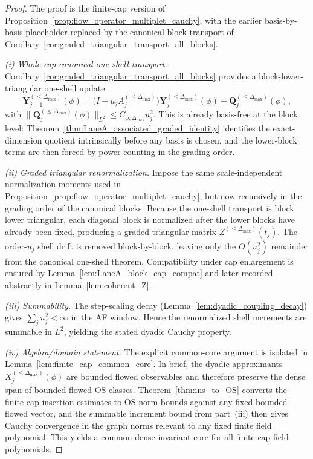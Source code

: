 \begin{proof}
The proof is the finite-cap version of Proposition~\ref{prop:flow_operator_multiplet_cauchy}, with the earlier basis-by-basis placeholder replaced by the canonical block transport of Corollary~\ref{cor:graded_triangular_transport_all_blocks}.

\smallskip
\noindent\emph{(i) Whole-cap canonical one-shell transport.}
Corollary~\ref{cor:graded_triangular_transport_all_blocks} provides a block-lower-triangular one-shell update
\[
\mathbf Y^{(\le \Delta_{\max})}_{j+1}(\phi)
=
\bigl(I+u_jA^{(\le \Delta_{\max})}_j\bigr)\mathbf Y^{(\le \Delta_{\max})}_j(\phi)
+\mathbf Q^{(\le \Delta_{\max})}_j(\phi),
\]
with $\|\mathbf Q^{(\le \Delta_{\max})}_j(\phi)\|_{L^2}\le C_{\phi,\Delta_{\max}}u_j^2$.
This is already basis-free at the block level: Theorem~\ref{thm:LaneA_associated_graded_identity} identifies the exact-dimension quotient intrinsically before any basis is chosen, and the lower-block terms are then forced by power counting in the grading order.

\smallskip
\noindent\emph{(ii) Graded triangular renormalization.}
Impose the same scale-independent normalization moments used in Proposition~\ref{prop:flow_operator_multiplet_cauchy}, but now recursively in the grading order of the canonical blocks.
Because the one-shell transport is block lower triangular, each diagonal block is normalized after the lower blocks have already been fixed, producing a graded triangular matrix $Z^{(\le\Delta_{\max})}(t_j)$.
The order-$u_j$ shell drift is removed block-by-block, leaving only the $O(u_j^2)$ remainder from the canonical one-shell theorem.
Compatibility under cap enlargement is ensured by Lemma~\ref{lem:LaneA_block_cap_compat} and later recorded abstractly in Lemma~\ref{lem:coherent_Z}.

\smallskip
\noindent\emph{(iii) Summability.}
The step-scaling decay (Lemma~\ref{lem:dyadic_coupling_decay}) gives $\sum_j u_j^2<\infty$ in the AF window.
Hence the renormalized shell increments are summable in $L^2$, yielding the stated dyadic Cauchy property.

\smallskip
\noindent\emph{(iv) Algebra/domain statement.}
The explicit common-core argument is isolated in Lemma~\ref{lem:finite_cap_common_core}.
In brief, the dyadic approximants $X^{(\le \Delta_{\max})}_j(\phi)$ are bounded flowed observables and therefore preserve the dense span of bounded flowed OS-classes.
Theorem~\ref{thm:ins_to_OS} converts the finite-cap insertion estimates to OS-norm bounds against any fixed bounded flowed vector,
and the summable increment bound from part~(iii) then gives Cauchy convergence in the graph norms relevant to any fixed finite field polynomial.
This yields a common dense invariant core for all finite-cap field polynomials.
\end{proof}

